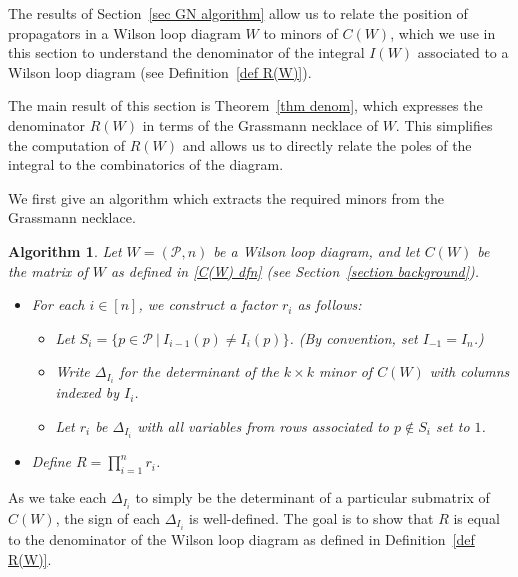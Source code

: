 \documentclass[11pt]{article}
\newcommand{\cP}{\mathcal{P}}
\newtheorem{algorithm}[thm]{Algorithm}
\theoremstyle{remark}
\theoremstyle{definition}
\begin{document}
The results of Section~\ref{sec GN algorithm} allow us to relate the position of propagators in a Wilson loop diagram $W$ to minors of $C(W)$, which we use in this section to understand the denominator of the integral $I(W)$ associated to a Wilson loop diagram (see Definition~\ref{def R(W)}). 

The main result of this section is Theorem~\ref{thm denom}, which expresses the denominator $R(W)$ in terms of the Grassmann necklace of $W$. This simplifies the computation of $R(W)$ and allows us to directly relate the poles of the integral to the combinatorics of the diagram.

We first give an algorithm which extracts the required minors from the Grassmann necklace. 


\begin{algorithm}\label{alg WLD to denom via GN}
Let $W = (\cP,n)$ be a Wilson loop diagram, and let $C(W)$ be the matrix of $W$ as defined in \eqref{C(W) dfn} (see Section~\ref{section background}).
\begin{itemize}
  \item For each $i \in [n]$, we construct a factor $r_i$ as follows:
    \begin{itemize}
      \item Let $S_i = \{p \in \cP \ | \ I_{i-1}(p) \neq I_i(p)\}$. (By convention, set $I_{-1} = I_n$.)
	  \item Write $\Delta_{I_i}$ for the determinant of the $k \times k$ minor of $C(W)$ with columns indexed by $I_i$.
      \item Let $r_i$ be $\Delta_{I_i}$ with all variables from rows associated to $p\not\in S_i$ set to $1$.
    \end{itemize}
  \item Define $R = \prod_{i=1}^n r_i$.
\end{itemize}
\end{algorithm}

As we take each $\Delta_{I_i}$ to simply be the determinant of a particular submatrix of $C(W)$, the sign of each $\Delta_{I_i}$ is well-defined.  The goal is to show that $R$ is equal to the denominator of the Wilson loop diagram as defined in Definition~\ref{def R(W)}.
\end{document}

